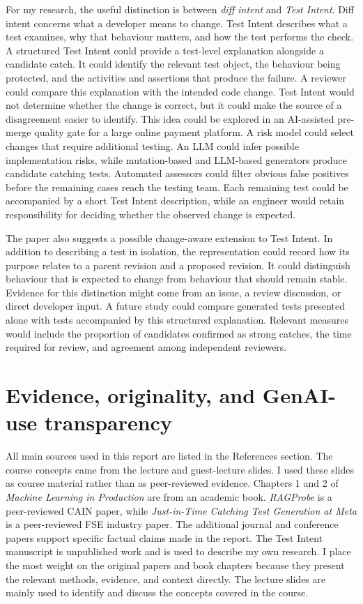 For my research, the useful distinction is between \emph{diff intent} and \emph{Test Intent}. Diff intent concerns what a developer means to change. Test Intent describes what a test examines, why that behaviour matters, and how the test performs the check. A structured Test Intent could provide a test-level explanation alongside a candidate catch. It could identify the relevant test object, the behaviour being protected, and the activities and assertions that produce the failure. A reviewer could compare this explanation with the intended code change. Test Intent would not determine whether the change is correct, but it could make the source of a disagreement easier to identify. This idea could be explored in an AI-assisted pre-merge quality gate for a large online payment platform. A risk model could select changes that require additional testing. An LLM could infer possible implementation risks, while mutation-based and LLM-based generators produce candidate catching tests. Automated assessors could filter obvious false positives before the remaining cases reach the testing team. Each remaining test could be accompanied by a short Test Intent description, while an engineer would retain responsibility for deciding whether the observed change is expected.

The paper also suggests a possible change-aware extension to Test Intent. In addition to describing a test in isolation, the representation could record how its purpose relates to a parent revision and a proposed revision. It could distinguish behaviour that is expected to change from behaviour that should remain stable. Evidence for this distinction might come from an issue, a review discussion, or direct developer input. A future study could compare generated tests presented alone with tests accompanied by this structured explanation. Relevant measures would include the proportion of candidates confirmed as strong catches, the time required for review, and agreement among independent reviewers.

\section{Evidence, originality, and GenAI-use transparency}

All main sources used in this report are listed in the References section. The course concepts came from the lecture and guest-lecture slides. I used these slides as course material rather than as peer-reviewed evidence. Chapters 1 and 2 of \emph{Machine Learning in Production} are from an academic book. \emph{RAGProbe} is a peer-reviewed CAIN paper, while \emph{Just-in-Time Catching Test Generation at Meta} is a peer-reviewed FSE industry paper. The additional journal and conference papers support specific factual claims made in the report. The Test Intent manuscript is unpublished work and is used to describe my own research. I place the most weight on the original papers and book chapters because they present the relevant methods, evidence, and context directly. The lecture slides are mainly used to identify and discuss the concepts covered in the course.

